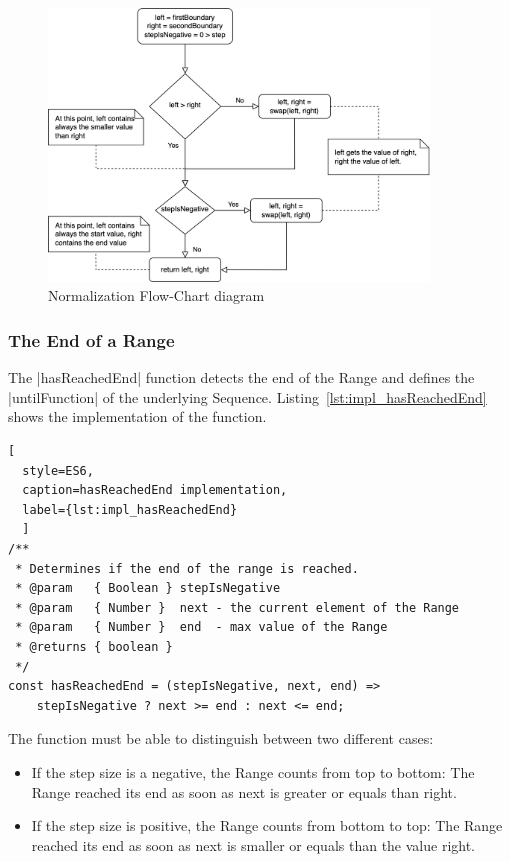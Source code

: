 \begin{figure}[H]
    \centering
    \includegraphics[width=0.9\textwidth]{mainmatter/pictures/boundary-normalization.png}
    \caption{Normalization Flow-Chart diagram}
    \label{fig:norm-flowchart}
\end{figure}

\subsubsection{The End of a Range}
\label{subsub:The End of a Range}
The |hasReachedEnd| function detects the end of the Range and defines the
|untilFunction| of the underlying Sequence. Listing~\ref{lst:impl_hasReachedEnd}
shows the implementation of the function. 

\begin{lstlisting}[
  style=ES6, 
  caption=hasReachedEnd implementation,
  label={lst:impl_hasReachedEnd}
  ]
/**
 * Determines if the end of the range is reached.
 * @param   { Boolean } stepIsNegative
 * @param   { Number }  next - the current element of the Range
 * @param   { Number }  end  - max value of the Range
 * @returns { boolean }
 */
const hasReachedEnd = (stepIsNegative, next, end) =>
    stepIsNegative ? next >= end : next <= end;
\end{lstlisting}

The function must be able to distinguish between two different cases:

\begin{itemize}
  \item{If the step size is a negative, the Range counts from top to bottom:
    The Range reached its end as soon as next is greater or equals than right.}
  \item{If the step size is positive, the Range counts from bottom to top: The
  Range reached its end as soon as next is smaller or equals than the value right.}
\end{itemize}

